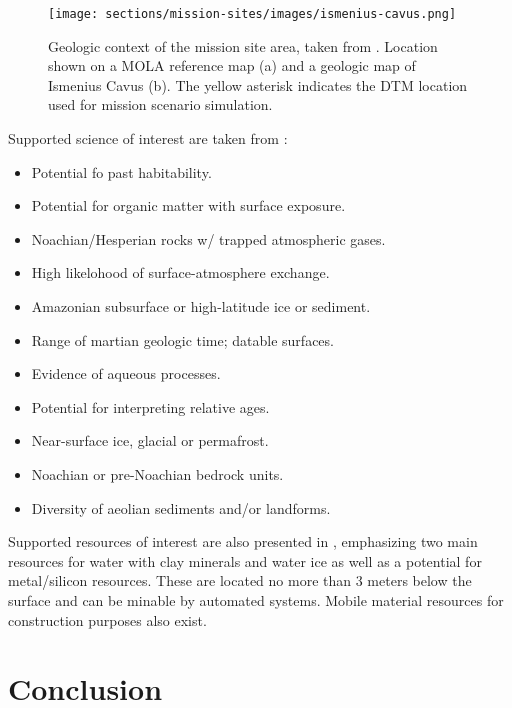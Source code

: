 \begin{figure}[h]
  \centering
  \hypersetup{linkcolor=captionTextColor}
  \texttt{[image: sections/mission-sites/images/ismenius-cavus.png]}\\
  \caption[Geologic context for Ismenius Cavus mission site area]
          {Geologic context of the mission site area, taken from . Location shown on a MOLA reference map (a) and a geologic map of Ismenius Cavus (b). The yellow asterisk indicates the DTM location used for mission scenario simulation.}
  \label{fig:mission-site-ismenius-cavus}
\end{figure}


Supported science of interest are taken from :
\begin{itemize}
    \item Potential fo past habitability.
    \item Potential for organic matter with surface exposure.
    \item Noachian/Hesperian rocks w/ trapped atmospheric gases.
    \item High likelohood of surface-atmosphere exchange.
    \item Amazonian subsurface or high-latitude ice or sediment.
    \item Range of martian geologic time; datable surfaces.
    \item Evidence of aqueous processes.
    \item Potential for interpreting relative ages.
    \item Near-surface ice, glacial or permafrost.
    \item Noachian or pre-Noachian bedrock units.
    \item Diversity of aeolian sediments and/or landforms.
\end{itemize}

Supported resources of interest are also presented in , emphasizing two main resources for water with clay minerals and water ice as well as a potential for metal/silicon resources. These are located no more than 3 meters below the surface and can be minable by automated systems. Mobile material resources for construction purposes also exist.

\section{Conclusion}
